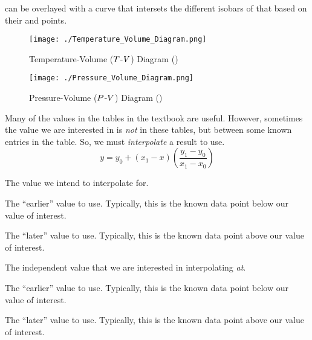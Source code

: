  can be overlayed with a curve that intersets the different isobars of that  based on their  and  points.

\begin{figure}[h!tbp]
  \centering
  \texttt{[image: ./Temperature\_Volume\_Diagram.png]}
  \caption{Temperature-Volume ($T$-$V$) Diagram (\cite[pg. 110]{ThermoTextbook})}
  \label{fig:Temperature_Pressure_Diagram}
\end{figure}

\begin{figure}[h!tbp]
  \centering
  \texttt{[image: ./Pressure\_Volume\_Diagram.png]}
  \caption{Pressure-Volume ($P$-$V$) Diagram (\cite[pg. 110]{ThermoTextbook})}
  \label{fig:Pressure_Volume_Diagram}
\end{figure}

\begin{definition}[Interpolate]\label{def:Interpolate}
  Many of the values in the tables in the textbook are useful.
  However, sometimes the value we are interested in is \textit{not} in these tables, but between some known entries in the table.
  So, we must \emph{interpolate} a result to use.
  \begin{equation}\label{eq:Interpolate}
    y = y_{0} + (x_{1} - x) \left( \frac{y_{1} - y_{0}}{x_{1} - x_{0}} \right)
  \end{equation}
  \begin{description}[noitemsep]
  \item[$y$] The value we intend to interpolate for.
  \item[$y_{0}$] The ``earlier'' value to use.
    Typically, this is the known data point below our value of interest.
  \item[$y_{1}$] The ``later'' value to use.
    Typically, this is the known data point above our value of interest.
  \item[$x$] The independent value that we are interested in interpolating \textit{at}.
  \item[$x_{0}$] The ``earlier'' value to use.
    Typically, this is the known data point below our value of interest.
  \item[$x_{1}$] The ``later'' value to use.
    Typically, this is the known data point above our value of interest.
  \end{description}
\end{definition}

